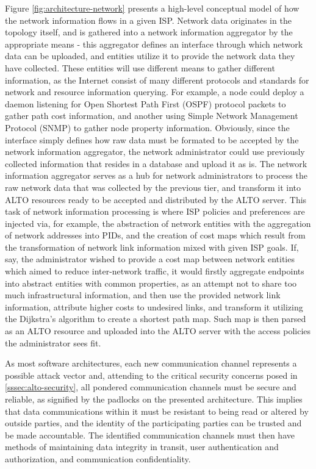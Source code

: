     Figure \ref{fig:architecture-network} presents a high-level conceptual model of how the network information flows in a given ISP.
    Network data originates in the topology itself, and is gathered into a network information aggregator by the appropriate means - this aggregator defines an interface through which network data can be uploaded, and entities utilize it to provide the network data they have collected.
    These entities will use different means to gather different information, as the Internet consist of many different protocols and standards for network and resource information querying.
    For example, a node could deploy a daemon listening for Open Shortest Path First (OSPF) protocol packets to gather path cost information, and another using Simple Network Management Protocol (SNMP) to gather node property information.
    Obviously, since the interface simply defines how raw data must be formated to be accepted by the network information aggregator, the network administrator could use previously collected information that resides in a database and upload it as is.
    The network information aggregator serves as a hub for network administrators to process the raw network data that was collected by the previous tier, and transform it into ALTO resources ready to be accepted and distributed by the ALTO server.
    This task of network information processing is where ISP policies and preferences are injected via, for example, the abstraction of network entities with the aggregation of network addresses into PIDs, and the creation of cost maps which result from the transformation of network link information mixed with given ISP goals.
    If, say, the administrator wished to provide a cost map between network entities which aimed to reduce inter-network traffic, it would firstly aggregate endpoints into abstract entities with common properties, as an attempt not to share too much infrastructural information, and then use the provided network link information, attribute higher costs to undesired links, and transform it utilizing the Dijkstra's algorithm to create a shortest path map.
    Such map is then parsed as an ALTO resource and uploaded into the ALTO server with the access policies the administrator sees fit.

    As most software architectures, each new communication channel represents a possible attack vector and, attending to the critical security concerns posed in \ref{sssec:alto-security}, all pondered communication channels must be secure and reliable, as signified by the padlocks on the presented architecture.
    This implies that data communications within it must be resistant to being read or altered by outside parties, and the identity of the participating parties can be trusted and be made accountable.
    The identified communication channels must then have methods of maintaining data integrity in transit, user authentication and authorization, and communication confidentiality.

